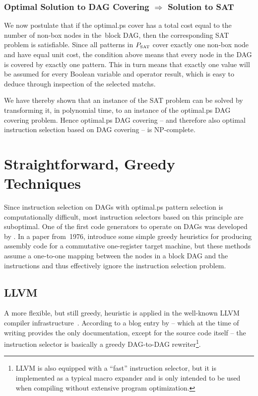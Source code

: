 \subsubsection{Optimal Solution to DAG Covering $\Rightarrow$ Solution to SAT}

We now postulate that if the \gls{optimal.ps} cover has a total cost equal
to the number of non-\glspl{box node} in the~\gls{block DAG}, then the
corresponding \gls{SAT} problem is satisfiable.
%
Since all \glspl{pattern} in
$\mPSat$ cover exactly one non-\gls{box node} and have equal unit cost, the
condition above means that every \gls{node} in the \gls{DAG} is covered by
exactly one \gls{pattern}.
%
This in turn means that exactly one value will be
assumed for every Boolean variable and operator result, which is easy to deduce
through inspection of the selected \glspl{match}.

We have thereby shown that an instance of the \gls{SAT} problem can be solved by
transforming it, in polynomial time, to an instance of the \gls{optimal.ps}
\gls{DAG covering} problem.
%
Hence \gls{optimal.ps} \gls{DAG covering} -- and
therefore also optimal \gls{instruction selection} based on
\gls{DAG covering} -- is NP-complete.
%
\hfill\qedsymbol


\section{Straightforward, Greedy Techniques}

Since \gls{instruction selection} on \glspl{DAG} with \gls{optimal.ps}
\gls{pattern selection} is computationally difficult, most \glspl{instruction
  selector} based on this \gls{principle} are suboptimal.
%
One of the first
\glspl{code generator} to operate on \glspl{DAG} was developed by
\textcite{Aho1976b}.
%
In a paper from~1976, \citeauthor{Aho1976b} introduce some
simple greedy heuristics for producing \gls{assembly code} for a commutative
one-\gls{register} \gls{target machine}, but these methods assume a one-to-one
mapping between the \glspl{node} in a \gls{block DAG} and the
\glspl{instruction} and thus effectively ignore the \gls{instruction selection}
problem.


\subsection{LLVM}

A more flexible, but still greedy, heuristic is applied in the well-known
\gls{LLVM} \gls{compiler} infrastructure~\cite{Lattner2004}.
%
According to a blog
entry by \textcite{Bendersky2013}\unskip%
%
 -- which at the time of writing provides the only documentation, except for
the source code itself -- the \gls{instruction selector} is basically a greedy
\mbox{\gls{DAG}-to-\gls{DAG}} rewriter\footnote{\gls{LLVM} is also equipped with
  a ``fast'' \gls{instruction selector}, but it is implemented as a typical
  \gls{macro expander} and is only intended to be used when compiling without
  extensive \gls{program} optimization.}.

